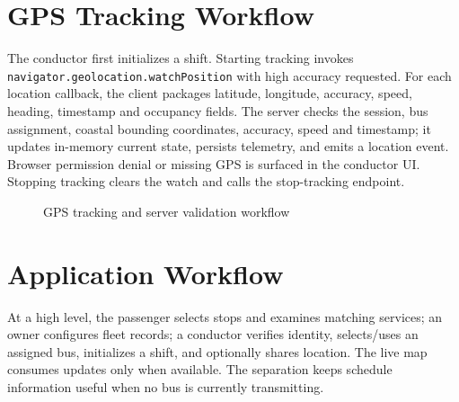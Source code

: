 \documentclass[12pt,a4paper]{report}
\begin{document}
\section{GPS Tracking Workflow}
The conductor first initializes a shift. Starting tracking invokes \texttt{navigator.geolocation.\allowbreak watchPosition} with high accuracy requested. For each location callback, the client packages latitude, longitude, accuracy, speed, heading, timestamp and occupancy fields. The server checks the session, bus assignment, coastal bounding coordinates, accuracy, speed and timestamp; it updates in-memory current state, persists telemetry, and emits a location event. Browser permission denial or missing GPS is surfaced in the conductor UI. Stopping tracking clears the watch and calls the stop-tracking endpoint.

\begin{figure}[tbp]\centering
{}\caption{GPS tracking and server validation workflow}\label{fig:gps}\end{figure}

\section{Application Workflow}
At a high level, the passenger selects stops and examines matching services; an owner configures fleet records; a conductor verifies identity, selects/uses an assigned bus, initializes a shift, and optionally shares location. The live map consumes updates only when available. The separation keeps schedule information useful when no bus is currently transmitting.
\end{document}
